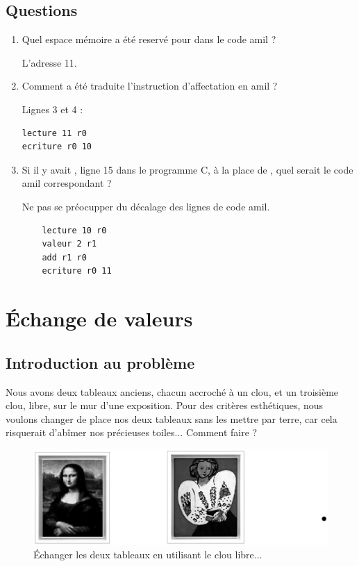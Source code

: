 \subsection{Questions}
\begin{enumerate}
\item Quel espace mémoire a été reservé pour  dans le code amil ?
  \begin{correction}
L'adresse 11.    
  \end{correction}
\item Comment a été traduite l'instruction d'affectation  en amil ?
  \begin{correction}
Lignes 3 et 4 :
\begin{verbatim}
lecture 11 r0
ecriture r0 10    
\end{verbatim}
  \end{correction}
\item Si il y avait , ligne 15 dans le programme C, à la place de , quel serait le code amil correspondant ?
  \begin{correction}
Ne pas se préocupper du décalage des lignes de code amil.
\begin{verbatim}
    lecture 10 r0
    valeur 2 r1
    add r1 r0
    ecriture r0 11
\end{verbatim}
  \end{correction}
\end{enumerate}



\section{Échange de valeurs}

\subsection{Introduction au problème}

Nous avons deux tableaux anciens, chacun accroché à un clou, et un
troisième clou, libre, sur le mur d'une exposition.
Pour des critères esthétiques, nous voulons changer de place nos deux tableaux sans les mettre par terre, car cela risquerait d'abîmer nos précieuses toiles... Comment faire ? 
\begin{figure}[h!]
    \begin{center}
        \includegraphics[scale=.8]{tableaux.eps}
    \end{center}
    \caption{Échanger les deux tableaux en utilisant le clou libre...}
    \label{fig:ex_onto}
\end{figure}

